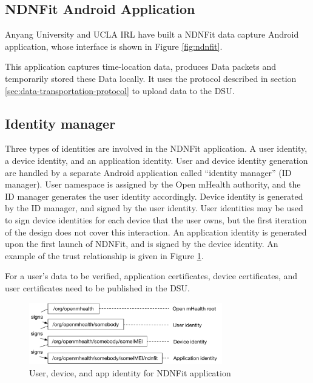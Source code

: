 \documentclass{article}
\begin{document}
\subsection{NDNFit Android Application}
Anyang University and UCLA IRL have built a NDNFit data capture Android application, whose interface is shown in Figure \ref{fig:ndnfit}.

This application captures time-location data, produces Data packets and temporarily stored these Data locally. It uses the protocol described in section \ref{sec:data-transportation-protocol} to upload data to the DSU.

\subsection{Identity manager}

Three types of identities are involved in the NDNFit application. A user identity, a device identity, and an application identity. User and device identity generation are handled by a separate Android application called ``identity manager'' (ID manager). User namespace is assigned by the Open mHealth authority, and the ID manager generates the user identity accordingly. Device identity is generated by the ID manager, and signed by the user identity. User identities may be used to sign device identities for each device that the user owns, but the first iteration of the design does not cover this interaction. An application identity is generated upon the first launch of NDNFit, and is signed by the device identity. An example of the trust relationship is given in Figure \ref{fig:identity-manager}.

For a user's data to be verified, application certificates, device certificates, and user certificates need to be published in the DSU.

\begin{figure}
\begin{center}
\includegraphics[width=0.75\textwidth]{NDNFit-identity-example}
\caption{User, device, and app identity for NDNFit application}
\label{fig:identity-manager}
\end{center}
\end{figure}
\end{document}
